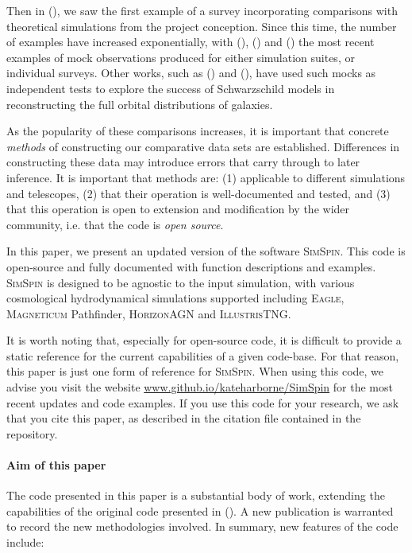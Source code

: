\documentclass[
  journal=pasa,
  manuscript=research-paper, %
  year=2020,
  volume=37,
]{cup-journal}
\newcommand{\simspin}[1]{\textsc{SimSpin}#1} %
\newcommand{\eagle}[1]{\textsc{Eagle}#1} %
\newcommand{\magneticum}[1]{\textsc{Magneticum}#1} %
\newcommand{\illustristng}[1]{\textsc{IllustrisTNG}#1} %
\newcommand{\horizon}[1]{\textsc{HorizonAGN}#1} %
\newcommand{\citetoggle}[1]{\citeauthor{#1} (\citeyear{#1})}
\begin{document}
Then in \citetoggle{Foster2021MAGPIOverview}, we saw the first example of a survey incorporating comparisons with theoretical simulations from the project conception. 
Since this time, the number of examples have increased exponentially, with \citetoggle{Bottrell2022RealisticIFS}, \citetoggle{Nanni2022iMaNGAcubes} and \citetoggle{Sarmiento2023MaNGIAanalysis} the most recent examples of mock observations produced for either simulation suites, or individual surveys.
Other works, such as \citetoggle{Poci2021Fornax3Danalysis} and \citetoggle{Zhu2022Massmass}, have used such mocks as independent tests to explore the success of Schwarzschild models in reconstructing the full orbital distributions of galaxies. 

As the popularity of these comparisons increases, it is important that concrete \textit{methods} of constructing our comparative data sets are established. 
Differences in constructing these data may introduce errors that carry through to later inference. 
It is important that methods are: (1) applicable to different simulations and telescopes, (2) that their operation is well-documented and tested, and (3) that this operation is open to extension and modification by the wider community, i.e. that the code is \textit{open source}. 

In this paper, we present an updated version of the software \simspin. 
This code is open-source and fully documented with function descriptions and examples.
\simspin{} is designed to be agnostic to the input simulation, with various cosmological hydrodynamical simulations supported including \eagle{}, \magneticum{} Pathfinder, \horizon{} and \illustristng. 

It is worth noting that, especially for open-source code, it is difficult to provide a static reference for the current capabilities of a given code-base. 
For that reason, this paper is just one form of reference for \simspin.
When using this code, we advise you visit the website \url{www.github.io/kateharborne/SimSpin} for the most recent updates and code examples.
If you use this code for your research, we ask that you cite this paper, as described in the citation file contained in the repository. 

\paragraph{Aim of this paper \\}

The code presented in this paper is a substantial body of work, extending the capabilities of the original code presented in \citetoggle{Harborne2020SimSpinCubes}. 
A new publication is warranted to record the new methodologies involved. 
In summary, new features of the code include:
\end{document}
